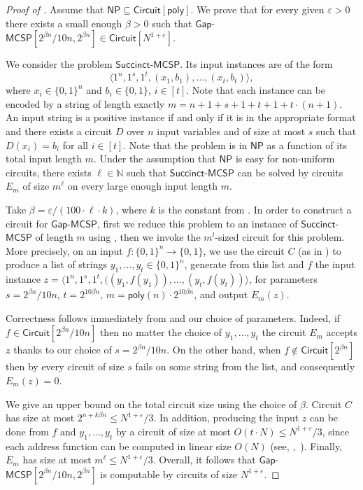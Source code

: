 \documentclass{toc}
\newcommand{\gapmcsp}{\mathsf{Gap}$-$\mathsf{MCSP}}
\begin{document}
\begin{proof}[Proof of ]
Assume that $\mathsf{NP} \subseteq \mathsf{Circuit}[\mathsf{poly}]$. We prove that for every given $\varepsilon > 0$ there exists a small enough $\beta > 0$ such that $\gapmcsp[2^{\beta n}/10n, 2^{\beta n}] \in \mathsf{Circuit}[N^{1 + \varepsilon}]$.

We consider the problem $\mathsf{Succinct}$-$\mathsf{MCSP}$. Its input instances are of the form
%
\[
\langle 1^n, 1^{s}, 1^t, (x_1, b_1), \ldots, (x_{t}, b_{t}) \rangle,
\]
where $x_i \in \{0,1\}^n$ and $b_i \in \{0,1\}$, $i \in [t]$. Note that each instance can be encoded by a string of length exactly $m = n + 1 + s + 1 + t + 1 + t \cdot (n + 1)$. An input string is a positive instance if and only if it is in the appropriate format and there exists a circuit $D$ over $n$ input variables and of size at most $s$ such that $D(x_i) = b_i$ for all $i \in [t]$. Note that the problem is in $\mathsf{NP}$ as a function of its total input length $m$. Under the assumption that $\mathsf{NP}$ is easy for non-uniform circuits, there exists $\ell \in \mathbb{N}$ such that $\mathsf{Succinct}$-$\mathsf{MCSP}$ can be solved by circuits $E_m$ of size $m^\ell$ on every large enough input length $m$. 

Take $\beta = \varepsilon/(100 \cdot \ell \cdot k)$, where $k$ is the constant from . In order to construct a circuit for $\gapmcsp$, first we reduce this problem to an instance of $\mathsf{Succinct}$-$\mathsf{MCSP}$ of length $m$ using , then we invoke the $m^l$-sized circuit for this problem. More precisely, on an input $f \colon \{0,1\}^n \to \{0,1\}$, we use the circuit $C$ (as in ) to produce a list of strings $y_1, \ldots, y_t \in \{0,1\}^n$, generate from this list and $f$ the input instance $z = \langle 1^n, 1^s, 1^t, ((y_1, f(y_1)), \ldots, (y_t, f(y_t)) \rangle$, for parameters $s = 2^{\beta n}/10n$, $t = 2^{10 \beta n}$, $m = \mathsf{poly}(n) \cdot 2^{10 \beta n}$, and output $E_m(z)$.

Correctness follows immediately from  and our choice of parameters. Indeed, if $f \in \mathsf{Circuit}[2^{\beta n}/10n]$ then no matter the choice of $y_1, \ldots, y_t$ the circuit $E_m$ accepts $z$ thanks to our choice of $s = 2^{\beta n}/10n$. On the other hand, when $f \notin \mathsf{Circuit}[2^{\beta n}]$ then by  every circuit of size $s$ fails on some string from the list, and consequently $E_m(z) = 0$.

%
We give an upper bound on  %
the total circuit size using the choice of $\beta$. Circuit $C$ has size at most $2^{n + k \beta n} \leq N^{1 + \varepsilon}/3$. In addition, producing the input $z$ can be done from $f$ and $y_1, \ldots ,y_t$ by a circuit of size at most $O(t \cdot N) \leq N^{1 + \varepsilon}/3$, since each address function can be computed in linear size $O(N)$ (see, \eg,~\cite{DBLP:books/teu/Wegener87}). Finally, $E_m$ has size at most $m^\ell \leq N^{1 + \varepsilon}/3$. Overall, it follows that $\gapmcsp[2^{\beta n}/10n, 2^{\beta n}]$ is computable by circuits of size $N^{1 + \varepsilon}$. 
\end{proof}
\end{document}
